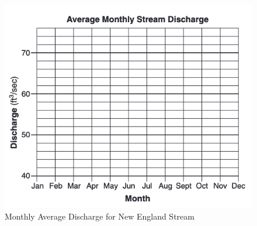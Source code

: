\documentclass[12pt]{article}
\begin{document}
\begin{enumerate}
\begin{enumerate}[a)]
\begin{figure}[h!] %
   \centering
   \includegraphics[width=5in]{gridchart.png} 
   \caption{Monthly Average Discharge for New England Stream}
   \label{fig:gridchart}
\end{figure}
\clearpage


\end{enumerate}
\end{enumerate}
\end{document}
